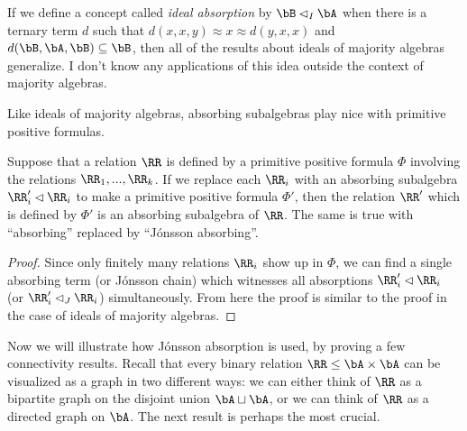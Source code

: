 \begin{rem} If we define a concept called \emph{ideal absorption} by $\bB \lhd_I \bA$ when there is a ternary term $d$ such that $d(x,x,y) \approx x \approx d(y,x,x)$ and $d(\bB,\bA,\bB) \subseteq \bB$, then all of the results about ideals of majority algebras generalize. I don't know any applications of this idea outside the context of majority algebras.%
\end{rem}

Like ideals of majority algebras, absorbing subalgebras play nice with primitive positive formulas.

\begin{prop} Suppose that a relation $\RR$ is defined by a primitive positive formula $\Phi$ involving the relations $\RR_1, ..., \RR_k$. If we replace each $\RR_i$ with an absorbing subalgebra $\RR_i' \lhd \RR_i$ to make a primitive positive formula $\Phi'$, then the relation $\RR'$ which is defined by $\Phi'$ is an absorbing subalgebra of $\RR$. The same is true with ``absorbing'' replaced by ``J\'onsson absorbing''.
\end{prop}
\begin{proof} Since only finitely many relations $\RR_i$ show up in $\Phi$, we can find a single absorbing term (or J\'onsson chain) which witnesses all absorptions $\RR_i' \lhd \RR_i$ (or $\RR_i' \lhd_J \RR_i$) simultaneously. From here the proof is similar to the proof in the case of ideals of majority algebras.
\end{proof}

Now we will illustrate how J\'onsson absorption is used, by proving a few connectivity results. Recall that every binary relation $\RR \le \bA\times \bA$ can be visualized as a graph in two different ways: we can either think of $\RR$ as a bipartite graph on the disjoint union $\bA \sqcup \bA$, or we can think of $\RR$ as a directed graph on $\bA$. The next result is perhaps the most crucial.

